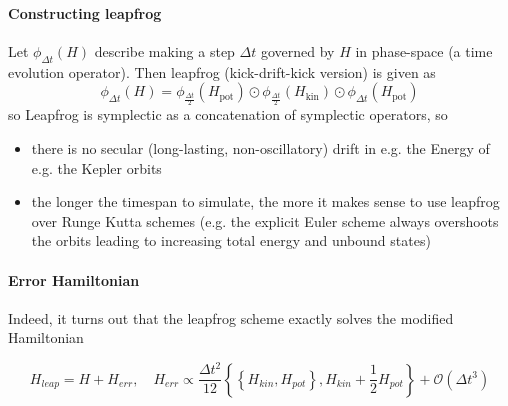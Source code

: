 \paragraph{Constructing leapfrog} Let $\phi_{\Delta t}(H)$ describe making a step $\Delta t$ governed by $H$ in phase-space
(a time evolution operator). Then leapfrog (kick-drift-kick version) is given as
\begin{equation}
  \phi_{\Delta t}(H) = \phi_{\frac{\Delta t}{2}}(H_{\text{pot}}) \odot \phi_{\frac{\Delta t}{2}}(H_{\text{kin}}) \odot \phi_{\Delta t}(H_{\text{pot}})
\end{equation}
\textcolor{blue1}{so Leapfrog is symplectic as a concatenation of symplectic operators}, so
\begin{itemize}
  \item there is no secular (long-lasting, non-oscillatory) drift in e.g. the Energy of e.g. the Kepler orbits
  \item the longer the timespan to simulate, the more it makes sense to use leapfrog over Runge Kutta schemes (e.g. the explicit Euler scheme always overshoots the orbits leading to increasing total energy and unbound states)
\end{itemize}


\paragraph{Error Hamiltonian} Indeed, it turns out that the leapfrog scheme exactly solves the modified Hamiltonian

\begin{equation}
  H_{leap} = H + H_{err}, \quad H_{err} \propto \frac{\Delta t^2}{12} \left\{ \left\{ H_{kin}, H_{pot} \right\}, H_{kin} + \frac{1}{2} H_{pot}\right\} + \mathcal{O}(\Delta t^3)
\end{equation}

